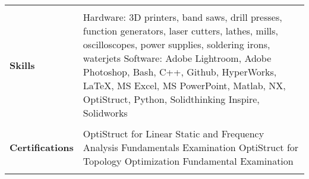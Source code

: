 \documentclass[12pt]{article}
\begin{document}
\begin{table}[H]
\begin{tabularx}{\textwidth}{@{}X p{6.25in} @{}}
		 & \\

		\textbf{Skills} & 
		Hardware: 
		3D printers, band saws, drill presses, function generators, laser cutters, lathes, mills, oscilloscopes, power supplies, soldering irons, waterjets \vspace{0.0625in} \newline 
		Software: 
		Adobe Lightroom, Adobe Photoshop, Bash, C++, Github, HyperWorks, \LaTeX, MS Excel, MS PowerPoint, Matlab, NX, OptiStruct, Python, Solidthinking Inspire, Solidworks \\

		 & \\

		\textbf{Certifications} & 
		OptiStruct for Linear Static and Frequency Analysis Fundamentals Examination \newline 
		OptiStruct for Topology Optimization Fundamental Examination \\

		 & \\

		
	\end{tabularx}
\end{table}
\end{document}
